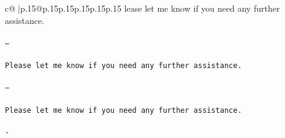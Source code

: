 \documentclass{article}
\begin{document}
{\begin{supertabular}{c@{$\;$}|p{.15\linewidth}@{}p{.15\linewidth}p{.15\linewidth}p{.15\linewidth}p{.15\linewidth}p{.15\linewidth}}
{{{lease let me know if you need any further assistance. \\ \tt \\ \tt ---\\ \tt \\ \tt Please let me know if you need any further assistance. \\ \tt \\ \tt ---\\ \tt \\ \tt Please let me know if you need any further assistance. \\ \tt \\ \tt -}}}
\end{supertabular}}
\end{document}
